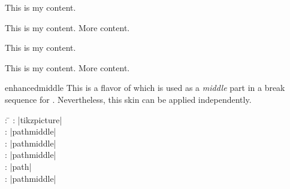 \begin{dispExample}
\begin{tcbraster}[skin=enhancedfirst,raster equal height,raster columns=4,
    colback=LightGreen,colframe=DarkGreen,colbacktitle=LimeGreen!75!DarkGreen,
    left=1mm,right=1mm,top=1mm,bottom=1mm,middle=1mm]
  \begin{tcolorbox}
    This is my content.
  \end{tcolorbox}
  \begin{tcolorbox}
    This is my content.
    \tcblower
    More content.
  \end{tcolorbox}
  \begin{tcolorbox}[adjusted title=My title]
    This is my content.
  \end{tcolorbox}
  \begin{tcolorbox}[adjusted title=My title]
    This is my content.
    \tcblower
    More content.
  \end{tcolorbox}
\end{tcbraster}
\end{dispExample}



\clearpage
\begin{docSkin}{enhancedmiddle}
This is a flavor of  which is used as a \emph{middle} part
in a break sequence for .
Nevertheless, this skin can be applied independently.
\begin{tcolorbox}[skintable=enhancedmiddle]
  \begin{tabbing}
    : \=\kill
    :  \> |tikzpicture|\\ 
    :           \> |pathmiddle|\\
    : \> |pathmiddle|\\ 
    :        \> |pathmiddle|\\
    :    \> |path|\\
    :           \> |pathmiddle|
  \end{tabbing}
\end{tcolorbox}
\end{docSkin}


